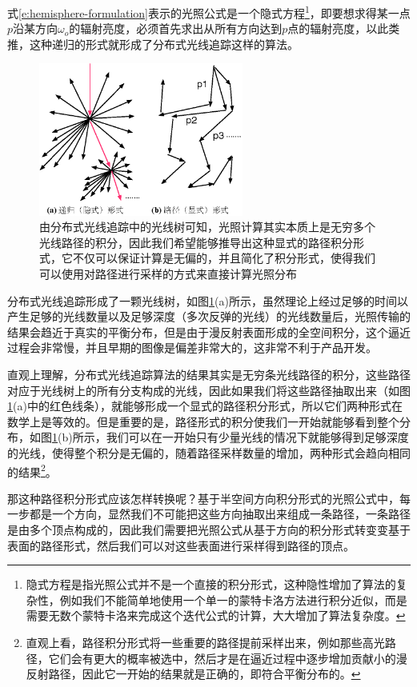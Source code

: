 式\ref{e:hemisphere-formulation}表示的光照公式是一个隐式方程\footnote{隐式方程是指光照公式并不是一个直接的积分形式，这种隐性增加了算法的复杂性，例如我们不能简单地使用一个单一的蒙特卡洛方法进行积分近似，而是需要无数个蒙特卡洛来完成这个迭代公式的计算，大大增加了算法复杂度。}，即要想求得某一点$p$沿某方向$\omega_o$的辐射亮度，必须首先求出从所有方向达到$p$点的辐射亮度，以此类推，这种递归的形式就形成了分布式光线追踪这样的算法。

\begin{figure}
	\sidecaption
	\includegraphics[width=0.6\textwidth]{figures/pt/path}
	\caption{由分布式光线追踪中的光线树可知，光照计算其实本质上是无穷多个光线路径的积分，因此我们希望能够推导出这种显式的路径积分形式，它不仅可以保证计算是无偏的，并且简化了积分形式，使得我们可以使用对路径进行采样的方式来直接计算光照分布}
	\label{f:pt-path}
\end{figure}

分布式光线追踪形成了一颗光线树，如图\ref{f:pt-path}(a)所示，虽然理论上经过足够的时间以产生足够的光线数量以及足够深度（多次反弹的光线）的光线数量后，光照传输的结果会趋近于真实的平衡分布，但是由于漫反射表面形成的全空间积分，这个逼近过程会非常慢，并且早期的图像是偏差非常大的，这非常不利于产品开发。

直观上理解，分布式光线追踪算法的结果其实是无穷条光线路径的积分，这些路径对应于光线树上的所有分支构成的光线，因此如果我们将这些路径抽取出来（如图\ref{f:pt-path}(a)中的红色线条），就能够形成一个显式的路径积分形式，所以它们两种形式在数学上是等效的。但是重要的是，路径形式的积分使我们一开始就能够看到整个分布，如图\ref{f:pt-path}(b)所示，我们可以在一开始只有少量光线的情况下就能够得到足够深度的光线，使得整个积分是无偏的，随着路径采样数量的增加，两种形式会趋向相同的结果\footnote{直观上看，路径积分形式将一些重要的路径提前采样出来，例如那些高光路径，它们会有更大的概率被选中，然后才是在逼近过程中逐步增加贡献小的漫反射路径，因此它一开始的结果就是正确的，即符合平衡分布的。}。

那这种路径积分形式应该怎样转换呢？基于半空间方向积分形式的光照公式中，每一步都是一个方向，显然我们不可能把这些方向抽取出来组成一条路径，一条路径是由多个顶点构成的，因此我们需要把光照公式从基于方向的积分形式转变变基于表面的路径形式，然后我们可以对这些表面进行采样得到路径的顶点。

